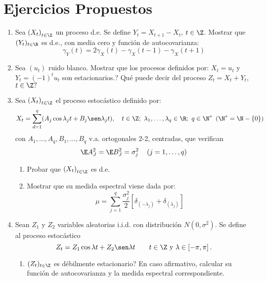 \section{Ejercicios Propuestos}

\begin{enumerate}
\item Sea ${(X_{t})}_{t\in \Z}$ un proceso d.e. Se define $Y_{t} =X_{t+1} -X_{t}$, $t\in \Z$. Mostrar que $(Y_{t} )_{t\in \R} $ es d.e., con media cero y funci\'{o}n de autocovarianza:
\[
\gamma_{Y} (t)=2\gamma_{X} (t)-\gamma_{X} (t-1)-\gamma_{X} (t+1)
\]

\item Sea $(u_{t})$ ruido blanco. Mostrar que los procesos definidos por: $X_{t} =u_{t}$ y $Y_{t} =(-1)^{t}u_{t}$ son estacionarios.? Qu\'{e} puede decir del proceso $Z_{t} =X_{t} +Y_{t}$, $t\in \Z?$

\item Sea $\left( {X_{t} } \right)_{t\in \Z} $ el proceso estoc\'{a}stico definido por:
\[
 X_{t} =\sum_{d=1}^q (A_{j} \cos \lambda_{j} t+B_{j} \sen \lambda_{j} t), \quad 
 t\in \Z;\ \lambda_{1},\ldots,\lambda_{q} \in \R;\ q\in \N^{\ast }\ \left( \N^{\ast }=\N-\left\{ 0 \right\} \right)
\]
con $A_{1} ,\ldots,A_{q} ,B_{1} ,\ldots,B_{q} $ v.a. ortogonales 2-2, centradas, que verifican 
\[
\E A_{J}^{2} =\E B_{J}^{2} =\sigma_{j}^{2} \quad \left( {j=1,\ldots,q} \right)
\]
\begin{enumerate}
\item Probar que $\left( {X_{t} } \right)_{t\in\Z} $ es d.e.
\item Mostrar que su medida espectral viene dada por:
\[
\mu =\sum_{j=1}^q \frac{\sigma_{j}^{2} }{2}\left[ {\delta 
_{\left( {-\lambda_{j} } \right)} +\delta_{\left( {\lambda_{j} } \right)} 
} \right]
\]
\end{enumerate}

\item Sean $Z_{1}$ y $Z_{2}$ variables aleatorias i.i.d. con distribuci\'{o}n $N(0, \sigma^{2})$. Se define al proceso estoc\'{a}stico
\begin{equation}\label{eq:1.01}
 Z_{t} =Z_{1} \cos \lambda t+Z_{2} \sen\lambda t \qquad t\in \Z\text{ y }\lambda \in \left[-\pi ,\pi \right].
\end{equation}

\begin{enumerate}
\item $(Z_{t})_{t\in \Z}$ es d\'{e}bilmente estacionario? En caso afirmativo, calcular su funci\'{o}n de autocovarianza y la medida espectral correspondiente.


\end{enumerate}
\end{enumerate}
